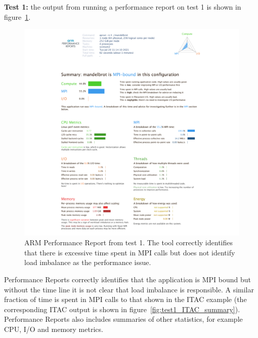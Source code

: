 \documentclass[a4paper,titlepage]{article}
\begin{document}
\noindent
\textbf{Test 1:} the output from running a performance report on test 1 is shown in figure~\ref{fig:perf-report_MB1}.
%
\begin{figure}[htbp]
\begin{center}
\includegraphics[scale=0.35]{figures/mandelbrot_v1_PerformanceReport}
\caption{ARM Performance Report from test 1. The tool correctly identifies that there is excessive time spent in MPI calls but does not identify load imbalance as the performance issue.}
\label{fig:perf-report_MB1}
\end{center}
\end{figure}
Performance Reports correctly identifies that the application is MPI bound but without the time line it is not clear that load imbalance is responsible.
A similar fraction of time is spent in MPI calls to that shown in the ITAC example (the corresponding ITAC output is shown in figure~\ref{fig:test1_ITAC_summary}). Performance Reports also includes summaries of other statistics, for example CPU, I/O and memory metrics. \\
\end{document}
